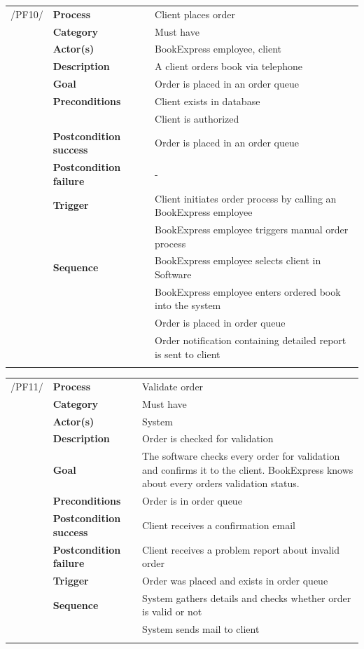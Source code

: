 \documentclass[11pt,a4paper,oneside,svgnames]{report}
\begin{document}
\noindent
\begin{tabular}{p{1.5cm}p{3cm}p{8cm}}
	 /PF10/	& \textbf{Process} & Client places order\\ 
		& \textbf{Category} & Must have\\
		& \textbf{Actor(s)} & BookExpress employee, client\\ 
		& \textbf{Description}	 & A client orders book via telephone\\ 
		& \textbf{Goal} & Order is placed in an order queue\\
		& \textbf{Preconditions} & Client exists in database\\
		& & Client is authorized\\
		& \textbf{Postcondition success} & Order is placed in an order queue\\
		& \textbf{Postcondition failure} & -\\
		& \textbf{Trigger} & Client initiates order process by calling an BookExpress employee\\
		& & BookExpress employee triggers manual order process\\
		& \textbf{Sequence} & BookExpress employee selects client in Software\\
		& & BookExpress employee enters ordered book into the system\\
		& & Order is placed in order queue\\
		& & Order notification containing detailed report is sent to client\\
\hfill \\
\end{tabular}

\noindent
\begin{tabular}{p{1.5cm}p{3cm}p{8cm}}
	 /PF11/	& \textbf{Process} & Validate order\\ 
		& \textbf{Category} & Must have\\
		& \textbf{Actor(s)} & System\\ 
		& \textbf{Description}	 & Order is checked for validation\\ 
		& \textbf{Goal} & The software checks every order for validation and confirms it to the client. BookExpress knows about every orders validation status.\\
		& \textbf{Preconditions} & Order is in order queue\\
		& \textbf{Postcondition success} & Client receives a confirmation email\\
		& \textbf{Postcondition failure} & Client receives a problem report about invalid order\\
		& \textbf{Trigger} & Order was placed and exists in order queue\\
		& \textbf{Sequence} & System  gathers details and checks whether order is valid or not\\
		& & System sends mail to client\\
\hfill \\
\end{tabular}
\end{document}
